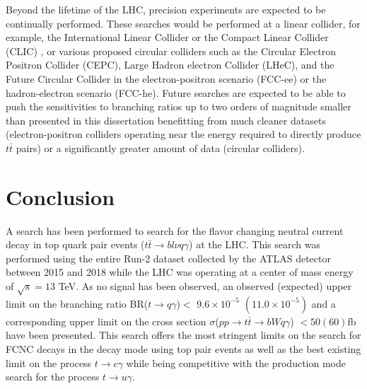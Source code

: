 Beyond the lifetime of the LHC, precision experiments are expected to be continually performed.  These searches would be performed at a linear collider, for example, the International Linear Collider \cite{Buesser:2013pza} or the Compact Linear Collider (CLIC) \cite{Zarnecki:2018lup}, or various proposed circular colliders such as the Circular Electron Positron Collider (CEPC), Large Hadron electron Collider (LHeC),  and the Future Circular Collider in the electron-positron scenario (FCC-ee) or the hadron-electron scenario (FCC-he)\cite{Benedikt:2015kqj}.   Future searches are expected to be able to push the sensitivities to branching ratios up to two orders of magnitude smaller than presented in this dissertation\cite{Cakir:2018ruj} benefitting from much cleaner datasets (electron-positron colliders operating near the energy required to directly produce $t\bar{t}$ pairs) or a significantly greater amount of data (circular colliders).

\section{Conclusion}

A search has been performed to search for the flavor changing neutral current decay in top quark pair events ($t\bar{t}\rightarrow bl\nu q \gamma$) at the LHC.  This search was performed using the entire Run-2 dataset collected by the ATLAS detector between 2015 and 2018 while the LHC was operating at a center of mass energy of $\sqrt{s}=13$ TeV.  As no signal has been observed, an observed (expected) upper limit on the branching ratio BR($t\rightarrow q \gamma$)$<$ $9.6\times10^{-5}$ $(11.0\times10^{-5})$ and a corresponding upper limit on the cross section $\sigma$($pp\rightarrow t\bar{t} \rightarrow bWq\gamma$) $< 50 (60)$fb have been presented.  This search offers the most stringent limits on the search for FCNC decays in the decay mode using top pair events as well as the best existing limit on the process $t\rightarrow c \gamma$ while being competitive with the production mode search for the process $t\rightarrow u \gamma$.

